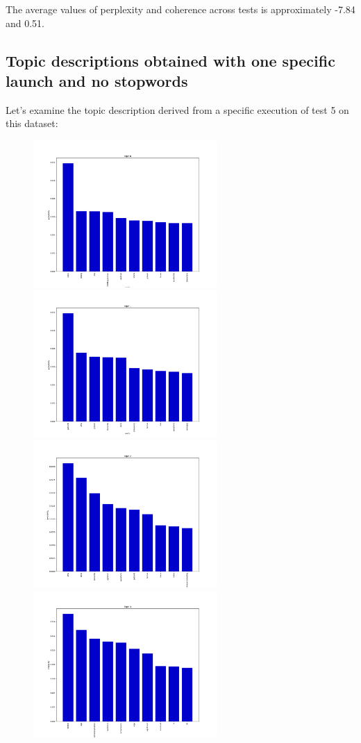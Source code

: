 \documentclass[10pt]{article} %
\begin{document}
	The average values of perplexity and coherence across tests is approximately -7.84 and 0.51. 
	
	\subsection{Topic descriptions obtained with one specific launch and no stopwords}
	
	Let's examine the topic description derived from a specific execution of test 5 on this dataset:
	
		\begin{figure}[H]
		\centering
		\includegraphics[width=7cm]{images/plots/test_5_no_stopwords_dataset_2/topic_0.png}
		\includegraphics[width=7cm]{images/plots/test_5_no_stopwords_dataset_2/topic_1.png}
		\includegraphics[width=7cm]{images/plots/test_5_no_stopwords_dataset_2/topic_2.png}
		\includegraphics[width=7cm]{images/plots/test_5_no_stopwords_dataset_2/topic_3.png}
	\end{figure}
		
\end{document}
